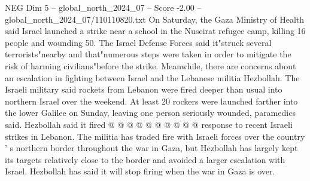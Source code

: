 \begin{textsample}{NEG Dim 5 – global\_north\_2024\_07 – Score -2.00 – global\_north\_2024\_07/110110820.txt}
On Saturday, the Gaza Ministry of Health said Israel launched a strike near a school in the Nuseirat refugee camp, killing 16 people and wounding 50.
The Israel Defense Forces said it"struck several terrorists"nearby and that"numerous steps were taken in order to mitigate the risk of harming civilians"before the strike.
Meanwhile, there are concerns about an escalation in fighting between Israel and the Lebanese militia Hezbollah.
The Israeli military said rockets from Lebanon were fired deeper than usual into northern Israel over the weekend.
At least 20 rockers were launched farther into the lower Galilee on Sunday, leaving one person seriously wounded, paramedics said.
Hezbollah said it fired @ @ @ @ @ @ @ @ @ @ response to recent Israeli strikes in Lebanon.
The militia has traded fire with Israeli forces over the country ' s northern border throughout the war in Gaza, but Hezbollah has largely kept its targets relatively close to the border and avoided a larger escalation with Israel.
Hezbollah has said it will stop firing when the war in Gaza is over.

\end{textsample}
